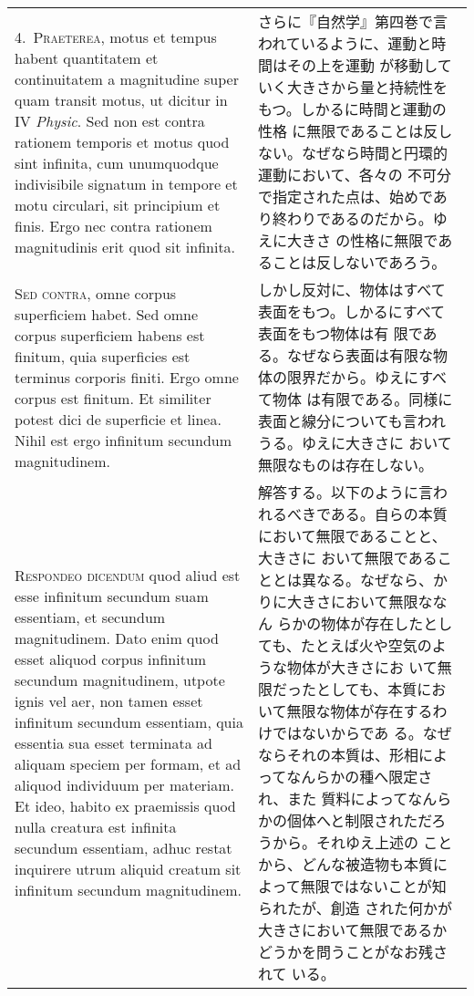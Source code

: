 \documentclass[10pt]{jsarticle} %
\begin{document}
\begin{longtable}{p{21em}p{21em}}
\\

4.~{\scshape Praeterea}, motus et tempus habent quantitatem et continuitatem a
 magnitudine super quam transit motus, ut dicitur in IV {\itshape Physic}. Sed non
 est contra rationem temporis et motus quod sint infinita, cum
 unumquodque indivisibile signatum in tempore et motu circulari, sit
 principium et finis. Ergo nec contra rationem magnitudinis erit quod
 sit infinita.

&

さらに『自然学』第四巻で言われているように、運動と時間はその上を運動
 が移動していく大きさから量と持続性をもつ。しかるに時間と運動の性格
 に無限であることは反しない。なぜなら時間と円環的運動において、各々の
 不可分で指定された点は、始めであり終わりであるのだから。ゆえに大きさ
 の性格に無限であることは反しないであろう。


\\


{\scshape Sed contra}, omne corpus superficiem habet. Sed omne corpus superficiem
 habens est finitum, quia superficies est terminus corporis finiti. Ergo
 omne corpus est finitum. Et similiter potest dici de superficie et
 linea. Nihil est ergo infinitum secundum magnitudinem.

&

しかし反対に、物体はすべて表面をもつ。しかるにすべて表面をもつ物体は有
 限である。なぜなら表面は有限な物体の限界だから。ゆえにすべて物体
 は有限である。同様に表面と線分についても言われうる。ゆえに大きさに
 おいて無限なものは存在しない。

\\


{\scshape Respondeo dicendum} quod aliud est esse infinitum secundum suam
 essentiam, et secundum magnitudinem. Dato enim quod esset aliquod
 corpus infinitum secundum magnitudinem, utpote ignis vel aer, non tamen
 esset infinitum secundum essentiam, quia essentia sua esset terminata
 ad aliquam speciem per formam, et ad aliquod individuum per
 materiam. Et ideo, habito ex praemissis quod nulla creatura est
 infinita secundum essentiam, adhuc restat inquirere utrum aliquid
 creatum sit infinitum secundum magnitudinem. 

&

解答する。以下のように言われるべきである。自らの本質において無限であることと、大きさに
 おいて無限であることとは異なる。なぜなら、かりに大きさにおいて無限ななん
 らかの物体が存在したとしても、たとえば火や空気のような物体が大きさにお
 いて無限だったとしても、本質において無限な物体が存在するわけではないからであ
 る。なぜならそれの本質は、形相によってなんらかの種へ限定され、また
 質料によってなんらかの個体へと制限されただろうから。それゆえ上述の
 ことから、どんな被造物も本質によって無限ではないことが知られたが、創造
 された何かが大きさにおいて無限であるかどうかを問うことがなお残されて
 いる。



\end{longtable}
\end{document}
